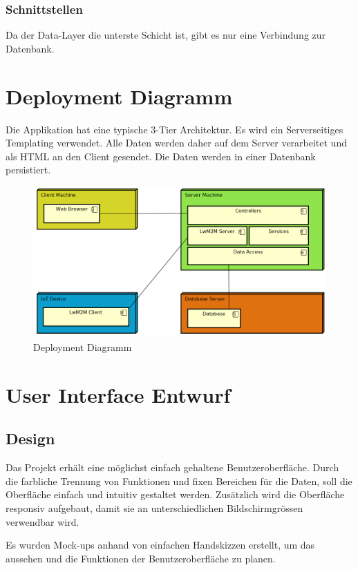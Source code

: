 \subsubsection{Schnittstellen}
Da der Data-Layer die unterste Schicht ist, gibt es nur eine Verbindung zur Datenbank.

\newpage

\section{Deployment Diagramm}
Die Applikation hat eine typische 3-Tier Architektur. Es wird ein Serverseitiges Templating verwendet. Alle Daten werden daher auf dem Server verarbeitet und als HTML an den Client gesendet. Die Daten werden in einer Datenbank persistiert.
\begin{figure}[H]
\center
\includegraphics[scale=0.6]{../03_Design/images/architekturuebersicht}\caption{Deployment Diagramm}
\end{figure}

\section{User Interface Entwurf}


\subsection{Design}
Das Projekt erhält eine möglichst einfach gehaltene Benutzeroberfläche. Durch die farbliche Trennung von Funktionen und fixen Bereichen für die Daten, soll die Oberfläche einfach und intuitiv gestaltet werden. Zusätzlich wird die Oberfläche responsiv aufgebaut, damit sie an unterschiedlichen Bildschirmgrössen verwendbar wird.

Es wurden Mock-ups anhand von einfachen Handskizzen erstellt, um das aussehen und die Funktionen der Benutzeroberfläche zu planen.

